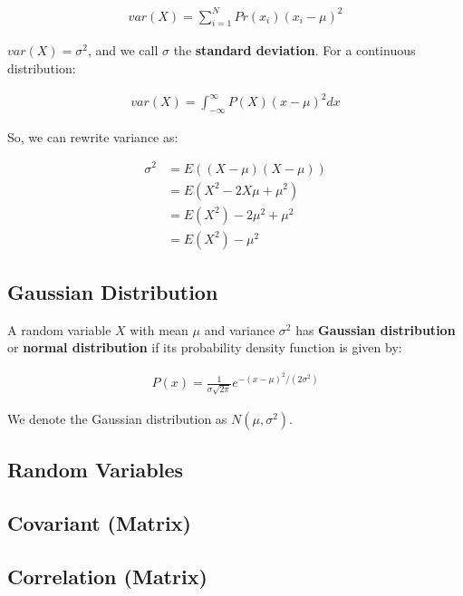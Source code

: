 \documentclass[11pt]{article}
\begin{document}
\begin{align*}
    var\left( X \right) = \sum_{i=1}^{N} Pr\left( x_{i} \right)\left( x_{i} - \mu \right)^{2}
\end{align*}

\(var\left( X \right) = \sigma^{2}\), and we call \(\sigma\) the \textbf{standard deviation}. For a continuous distribution:

\begin{align*}
    var\left( X \right) = \int_{-\infty}^{\infty} P\left( X \right)\left( x - \mu \right)^{2}dx
\end{align*}

So, we can rewrite variance as:

\begin{align*}
    \sigma^{2} &= E\left(\left( X - \mu \right)\left( X - \mu \right)\right) \\
    &= E\left( X^{2} - 2X\mu + \mu^{2} \right) \\
    &= E\left( X^{2} \right) - 2\mu^{2} + \mu^{2} \\
    &= E\left( X^{2} \right) - \mu^{2}
\end{align*}

\subsection{Gaussian Distribution}
\label{sec:org905a590}
A random variable \(X\) with mean \(\mu\) and variance \(\sigma^{2}\) has \textbf{Gaussian distribution} or \textbf{normal distribution} if its probability density function is given by:

\begin{align*}
    P\left( x \right) = \frac{1}{\sigma\sqrt{2\pi}}e^{-\left( x - \mu \right)^{2}/\left(2\sigma^{2}\right)}
\end{align*}

We denote the Gaussian distribution as \(N\left( \mu,\sigma^{2} \right)\).

\subsection{Random Variables}
\label{sec:org398e9d2}
\subsection{Covariant (Matrix)}
\label{sec:org50de85b}
\subsection{Correlation (Matrix)}
\label{sec:org027a1db}
\end{document}
